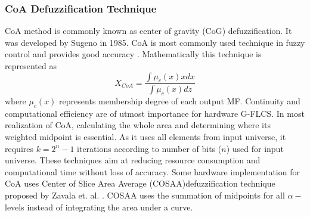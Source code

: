 \subsubsection{CoA Defuzzification Technique}
CoA method is commonly known as center of gravity (CoG) defuzzification. It was developed by Sugeno in 1985\cite{Sugeno1985}. CoA is most commonly used technique in fuzzy control and provides good accuracy \cite{Ross2010,Patel2002}. 
Mathematically this technique is represented as
\[{X_{CoA}} = \frac{{\int {{\mu _c}(x)xdx} }}{{\int {{\mu _c}(x)dz} }}\]
where $ {\mu _c}(x)  $ represents membership degree of each output MF.
Continuity and computational efficiency are of utmost importance for hardware G\hyp{}FLCS. In most realization of CoA, calculating the whole area and determining where its weighted midpoint is essential. As it uses all elements from input universe, it requires $ k = {2^n} - 1 $ iterations according to number of bits ($ n $) used for input universe. These techniques aim at reducing resource consumption and computational time without loss of accuracy. 
Some hardware implementation for CoA uses Center of Slice Area Average (COSAA)defuzzification technique proposed by Zavala et. al. \cite{Zavala2011,HernandezZavala2013,Zavala2010}. COSAA uses the summation of midpoints for all $ \alpha - $ levels instead of integrating the area under a curve. 

